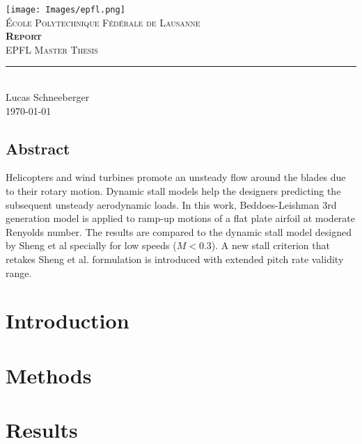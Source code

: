 \documentclass[11pt]{report}
\begin{document}
\begin{titlepage}
	\centering
    \texttt{[image: Images/epfl.png]}\\[0.25cm] 	%
    \textsc{\LARGE École Polytechnique Fédérale de Lausanne}\\ \vspace{\fill}
    \textbf{\textsc{\fontsize{50}{50}\selectfont Report}}\\ \vspace{\fill}		
	\textsc{\LARGE EPFL Master Thesis}\\[0.4cm]
	\rule{\linewidth}{0.2 mm} \\[0.5 cm]
	Lucas Schneeberger \\[2cm] \today
\end{titlepage}
\restoregeometry

\thispagestyle{numberonly}

\begin{summary}
\section*{Abstract}
Helicopters and wind turbines promote an unsteady flow around the blades due to their rotary motion. Dynamic stall models help the designers predicting the subsequent unsteady aerodynamic loads. In this work, Beddoes-Leishman 3rd generation model is applied to ramp-up motions of a flat plate airfoil at moderate Renyolds number. The results are compared to the dynamic stall model designed by Sheng et al specially for low speeds ($M<0.3$). A new stall criterion that retakes Sheng et al. formulation is introduced with extended pitch rate validity range. 
\end{summary}

\tableofcontents

\chapter{Introduction}


\chapter{Methods}


\chapter{Results}

\end{document}
